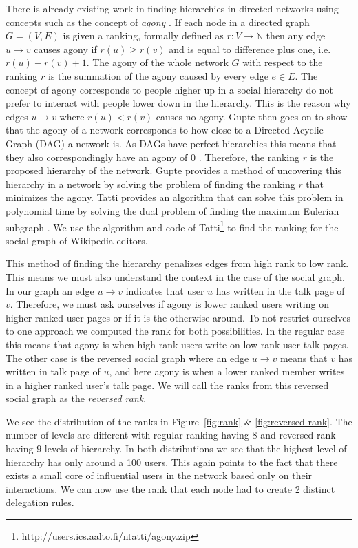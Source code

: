 There is already existing work in finding hierarchies in directed networks using concepts such as the concept of \textit{agony} \cite{Tatti2016,gupte2011finding}. If each node in a directed graph $G = (V,E)$ is given a ranking, formally defined as $r:V\rightarrow \mathbb{N}$ then any edge $u\rightarrow v$ causes agony if $r(u)\geq r(v)$ and is equal to difference plus one, i.e. $r(u)-r(v)+1$. The agony of the whole network $G$ with respect to the ranking $r$ is the summation of the agony caused by every edge $e \in E$. The concept of agony corresponds to people higher up in a social hierarchy do not prefer to interact with people lower down in the hierarchy. This is the reason why edges $u\rightarrow v$ where $r(u)<r(v)$ causes no agony. Gupte then goes on to show that the agony of a network corresponds to how close to a Directed Acyclic Graph (DAG) a network is. As DAGs have perfect hierarchies this means that they also correspondingly have an agony of $0$ \cite{gupte2011finding}. Therefore, the ranking $r$ is the proposed hierarchy of the network. Gupte provides a method of uncovering this hierarchy in a network by solving the problem of finding the ranking $r$ that minimizes the agony. Tatti provides an algorithm that can solve this problem in polynomial time by solving the dual problem of finding the maximum Eulerian subgraph \cite{Tatti2016}. We use the algorithm and code of Tatti\footnote{http://users.ics.aalto.fi/ntatti/agony.zip} to find the ranking for the social graph of Wikipedia editors. 
\smallskip

This method of finding the hierarchy penalizes edges from high rank to low rank. This means we must also understand the context in the case of the social graph. In our graph an edge $u \rightarrow v$ indicates that user $u$ has written in the talk page of $v$. Therefore, we must ask ourselves if agony is lower ranked users writing on higher ranked user pages or if it is the otherwise around. To not restrict ourselves to one approach we computed the rank for both possibilities. In the regular case this means that agony is when high rank users write on low rank user talk pages. The other case is the reversed social graph where an edge $u \rightarrow v$ means that $v$ has written in talk page of $u$, and here agony is when a lower ranked member writes in a higher ranked user's talk page. We will call the ranks from this reversed social graph as the \textit{reversed rank}. 
\smallskip

We see the distribution of the ranks in Figure~\ref{fig:rank} \& \ref{fig:reversed-rank}. The number of levels are different with regular ranking having $8$ and reversed rank having $9$ levels of hierarchy. In both distributions we see that the highest level of hierarchy has only around a 100 users. This again points to the fact that there exists a small core of influential users in the network based only on their interactions. We can now use the rank that each node had to create 2 distinct delegation rules.
\smallskip

